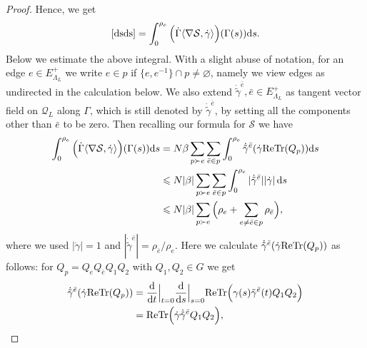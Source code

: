 \documentclass[11pt,UTF-8,reqno]{amsart}
\numberwithin{equation}{section}
\def\Re{{\mathrm{Re}}}
\def\<{{\langle}}
\def\>{{\rangle}}
\def\tr{\mathrm {tr}}
\def\dif{{\mathord{{\rm d}}}}
\def\no{\nonumber}
\def\cQ{{\mathcal Q}}
\def\cS{{\mathcal S}}
\def\leq{\leqslant}
\let\emptyset\varnothing
\def\Re{{\mathrm{Re}}}
\def\<{{\langle}}
\def\>{{\rangle}}
\def\tr{\mathrm {tr}}
\def\dif{{\mathord{{\rm d}}}}
\def\tr{{\rm Tr}}
\def\no{\nonumber}
\def\leq{\leqslant}
\def\<{\langle} \def\>{\rangle}
\begin{document}
\begin{proof}
Hence, we get
$$
\eqref{dsds} = \int_0^{\rho_e}   \Big( \dot\Gamma\<\nabla \cS,\dot \gamma\> \Big) (\Gamma(s))\dif s.
$$
 Below we estimate the above integral. With a slight abuse of notation,
for an edge $e\in E^+_{\Lambda_L}$ we write $e\in p$ if $\{e,e^{-1}\}\cap p \neq \emptyset$, namely we view edges as undirected in the calculation below.
We also extend $\dot{\tilde\gamma}^{\bar e}, \bar e\in E^+_{\Lambda_L}$  as tangent vector field on $\cQ_L$ along $\Gamma$, which is still denoted by $\dot{\tilde\gamma}^{\bar e}$, by setting all the  components other than ${\bar e}$ to be zero.
Then recalling our formula for $\cS$ we have
\begin{align}
	\int_0^{\rho_e}  \Big( \dot\Gamma\<\nabla \cS,\dot \gamma\> \Big) (\Gamma(s))\dif s\no
	&=N\beta\sum_{p\succ e}\sum_{\bar e\in p}
	\int_0^{\rho_e}\dot{\tilde{\gamma}}^{\bar e}(\dot\gamma \Re\tr(Q_p)) \dif s\no
	\\
	&\leq N|\beta|\sum_{p\succ e}\sum_{\bar e\in p}\int_0^{\rho_e}|\dot{\tilde{\gamma}}^{\bar e}||\dot\gamma| \, \dif s\no
	\\
	&\leq N|\beta| \sum_{p\succ e}
	\Big(\rho_e+ \sum_{e\neq\bar e\in p}\rho_{\bar e}\Big),\label{eq:za1}
\end{align}
where we used $|\dot \gamma|=1$ and $|\dot{\tilde{\gamma}}^{\bar e}|=\rho_{\bar e}/\rho_e$.
Here we  calculate
$\dot{\tilde{\gamma}}^{\bar e}(\dot\gamma \Re\tr(Q_p))$
as follows: for $Q_p=Q_eQ_{\bar e}Q_1Q_2$ with $Q_1, Q_2\in G$ we get
\begin{align*}
\dot{\tilde{\gamma}}^{\bar e}
(\dot\gamma \Re\tr(Q_p))
&=\frac{\dif}{\dif t}\Big|_{t=0}\frac{\dif}{\dif s}\Big|_{s=0}
\Re\tr\Big(\gamma(s) {\tilde{\gamma}}^{\bar e}(t) Q_1Q_2\Big)
\\
&=\Re\tr\Big(\dot\gamma \dot{\tilde{\gamma}}^{\bar e}Q_1Q_2\Big),
\end{align*}

\end{proof}
\end{document}
